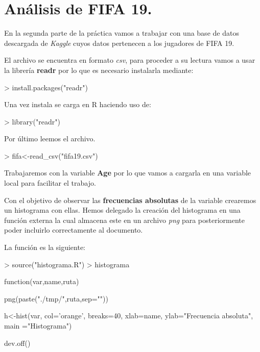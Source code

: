\documentclass [a4paper] {article}
\begin{document}
\newpage
\section{An\'alisis de FIFA 19.}
En la segunda parte de la pr\'actica vamos a trabajar con una base de datos descargada de
\textit{Kaggle} cuyos datos pertenecen a los jugadores de FIFA 19.

\bigskip
El archivo se encuentra en formato \textit{csv}, para proceder a su lectura vamos a usar la 
librer\'ia \textbf{readr} por lo que es necesario instalarla mediante:
\begin{Schunk}
\begin{Sinput}
> install.packages("readr")
\end{Sinput}
\end{Schunk}

\bigskip
Una vez instala se carga en R haciendo uso de:
\begin{Schunk}
\begin{Sinput}
> library("readr")
\end{Sinput}
\end{Schunk}

\bigskip
Por \'ultimo leemos el archivo.
\begin{Schunk}
\begin{Sinput}
> fifa<-read_csv("fifa19.csv")
\end{Sinput}
\end{Schunk}

\bigskip
Trabajaremos con la variable \textbf{Age} por lo que vamos a cargarla en una variable
local para facilitar el trabajo.
\begin{Schunk}
\end{Schunk}

\bigskip
Con el objetivo de observar las \textbf{frecuencias absolutas} de la variable crearemos un histograma con ellas. Hemos delegado
la creaci\'on del histograma en una funci\'on externa la cual almacena este en un archivo \textit{png} para posteriormente poder incluirlo
correctamente al documento.

La funci\'on es la siguiente:
\begin{Schunk}
\begin{Sinput}
> source("histograma.R")
> histograma
\end{Sinput}
\begin{Soutput}
function(var,name,ruta) {
    png(paste("./tmp/",ruta,sep=""))
 
    h<-hist(var, col='orange', breaks=40, xlab=name, 
            ylab="Frecuencia absoluta", main ="Histograma") 

    dev.off()
}
\end{Soutput}
\end{Schunk}
\end{document}
